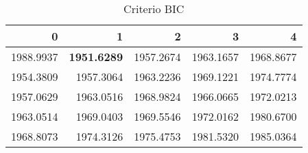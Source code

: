 \begin{table}[H]
\label{tab:autoarima_bic}
\centering
\begin{tabular}{rrrrr}
\toprule
0 & 1 & 2 & 3 & 4 \\
\midrule
1988.9937 & \textbf{1951.6289} & 1957.2674 & 1963.1657 & 1968.8677 \\
1954.3809 & 1957.3064 & 1963.2236 & 1969.1221 & 1974.7774 \\
1957.0629 & 1963.0516 & 1968.9824 & 1966.0665 & 1972.0213 \\
1963.0514 & 1969.0403 & 1969.5546 & 1972.0162 & 1980.6700 \\
1968.8073 & 1974.3126 & 1975.4753 & 1981.5320 & 1985.0364 \\
\bottomrule
\end{tabular}
\caption{Criterio BIC}
\end{table}
